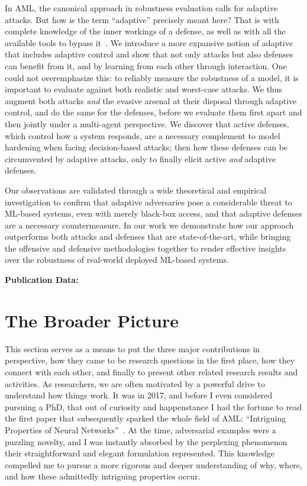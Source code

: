 In \gls{AML}, the canonical approach in robustness evaluation calls for adaptive attacks.
But how is the term ``adaptive'' precisely meant here?
That is with complete knowledge of the inner workings of a defense, as well as with all the available tools to bypass it~\cite{tramer2020adaptive}.
We introduce a more expansive notion of adaptive that includes adaptive control \cite{aastrom2013adaptive} and show that not only attacks but also defenses can benefit from it, and by learning from each other through interaction.
One could not overemphasize this: to reliably measure the robustness of a model, it is important to evaluate against both realistic and worst-case attacks.
We thus augment both attacks \emph{and} the evasive arsenal at their disposal through adaptive control, and do the same for the defenses, before we evaluate them first apart and then jointly under a multi-agent perspective.
We discover that active defenses, which control how a system responds, are a necessary complement to model hardening when facing decision-based attacks; then how these defenses can be circumvented by adaptive attacks, only to finally elicit active \emph{and} adaptive defenses.

Our observations are validated through a wide theoretical and empirical investigation to confirm that adaptive adversaries pose a considerable threat to ML-based systems, even with merely black-box access, and that adaptive defenses are a necessary countermeasure.
In our work we demonstrate how our approach outperforms both attacks and defenses that are state-of-the-art, while bringing the offensive and defensive methodologies together to render effective insights over the robustness of real-world deployed ML-based systems.

\textbf{Publication Data:} 

\section{The Broader Picture}

This section serves as a means to put the three major contributions in perspective, how they came to be research questions in the first place, how they connect with each other, and finally to present other related research results and activities.
As researchers, we are often motivated by a powerful drive to understand how things work.
It was in 2017, and before I even considered pursuing a PhD, that out of curiosity and happenstance I had the fortune to read the first paper that subsequently sparked the whole field of \gls{AML}: ``Intriguing Properties of Neural Networks''~\cite{szegedy2013intriguing}.
At the time, adversarial examples were a puzzling novelty, and I was instantly absorbed by the perplexing phenomenon their straightforward and elegant formulation represented.
This knowledge compelled me to pursue a more rigorous and deeper understanding of why, where, and how these admittedly intriguing properties occur.

